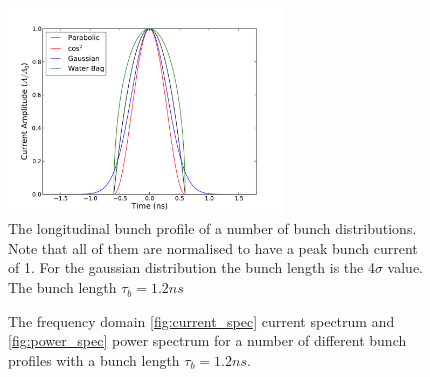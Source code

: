 \begin{figure}
\begin{center}
\includegraphics[width=0.65\textwidth]{Wakefields_and_Impedances/figures/bunch_profile_12ns.pdf}
\end{center}
\label{fig:time_bunch_profiles}
\caption{The longitudinal bunch profile of a number of bunch distributions. Note that all of them are normalised to have a peak bunch current of 1. For the gaussian distribution the bunch length is the 4$\sigma$ value. The bunch length $\tau_{b} = 1.2ns$}
\end{figure}

\begin{figure}
\label{fig:freq_dom_prof}
\caption{The frequency domain \ref{fig:current_spec} current spectrum and \ref{fig:power_spec} power spectrum for a number of different bunch profiles with a bunch length $\tau_{b} = 1.2ns$.}
\end{figure}

